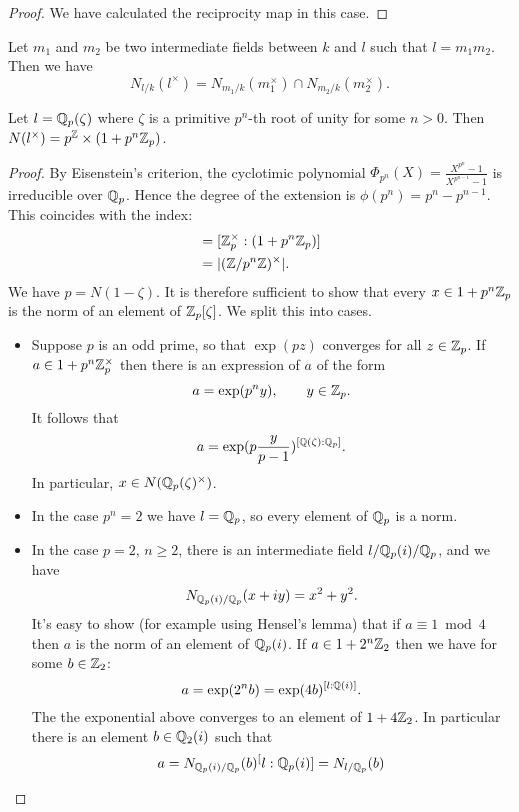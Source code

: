 \begin{proof}
	We have calculated the reciprocity map in this case.
\end{proof}

\begin{lemma}
	Let $m_1$ and $m_2$ be two intermediate fields between $k$ and $l$
	such that $l = m_1 m_2$.
	Then we have
	\[
		N_{l/k}(l^\times) = N_{m_1/k} (m_1^\times) \cap N_{m_2/k} (m_2^\times).
	\]
\end{lemma}


\begin{example}
	Let $l = {\mathbb Q}_p(\zeta)$ where $\zeta$ is a primitive $p^n$-th root of unity
	for some $n > 0$.
	Then $N(l^\times) = p^{\mathbb Z} \times (1+p^n {\mathbb Z}_p)$.
\end{example}

\begin{proof}
	By Eisenstein's criterion, the cyclotimic polynomial
	$\Phi_{p^n}(X) = \frac{X^{p^n}-1}{X^{p^{n-1}}-1}$ is irreducible over ${\mathbb Q}_p$.
	Hence the degree of the extension is $\phi(p^n)=p^n - p^{n-1}$.
	This coincides with the index:
	\begin{align*}
		[\Q_p^\times : p^\Z \times (1+p^n \Z_p)]
		&= [\Z_p^\times : (1+p^n \Z_p)] \\
		&= | (\Z / p^n \Z)^\times |.
	\end{align*}
	We have $p = N(1-\zeta)$.
	It is therefore sufficient to show that every $x \in 1 + p^n {\mathbb Z}_p$
	is the norm of an element of ${\mathbb Z}_p[\zeta]$. We split this into cases.
	\begin{itemize}
		\item
		Suppose $p$ is an odd prime, so that $\exp(pz)$ converges for all $z\in {\mathbb Z}_p$.
		If $a \in 1 +p^n{\mathbb Z}_p^\times$ then there is an expression of $a$ of the form
		\[
			a = \exp(p^n y), \qquad y \in {\mathbb Z}_p.
		\]
		It follows that
		\[
			a= \exp(p\frac{y}{p-1}) ^{[{\mathbb Q}(\zeta):{\mathbb Q}_p]}.
		\]
		In particular, $x\in N({\mathbb Q}_p(\zeta)^\times)$.
		\item
		In the case $p^n = 2$ we have $l = {\mathbb Q}_p$, so every element of ${\mathbb Q}_p$ is a norm.
		\item
		In the case $p=2$, $n \ge 2$, there is an intermediate field $l / {\mathbb Q}_p(i) / {\mathbb Q}_p$,
		and we have
		\[
			N_{{\mathbb Q}_p(i) / {\mathbb Q}_p} (x+i y) = x^2 + y^2.
		\]
		It's easy to show (for example using Hensel's lemma) that if $a \equiv 1 \bmod 4$
		then $a$ is the norm of an element of ${\mathbb Q}_p(i)$.
		If $a \in 1 + 2^n {\mathbb Z}_2$ then we have for some $b \in {\mathbb Z}_2$:
		\[
			a = \exp(2^n b) = \exp(4b)^{[l:{\mathbb Q}(i)]}.
		\]
		The the exponential above converges to an element of $1+4{\mathbb Z}_2$.
		In particular there is an element $b \in {\mathbb Q}_2(i)$ such that
		\[
			a = N_{{\mathbb Q}_p(i)/{\mathbb Q}_p} (b) ^ [l:{\mathbb Q}_p(i)]
			= N_{l/{\mathbb Q}_p} (b)
		\]
	\end{itemize}
\end{proof}

